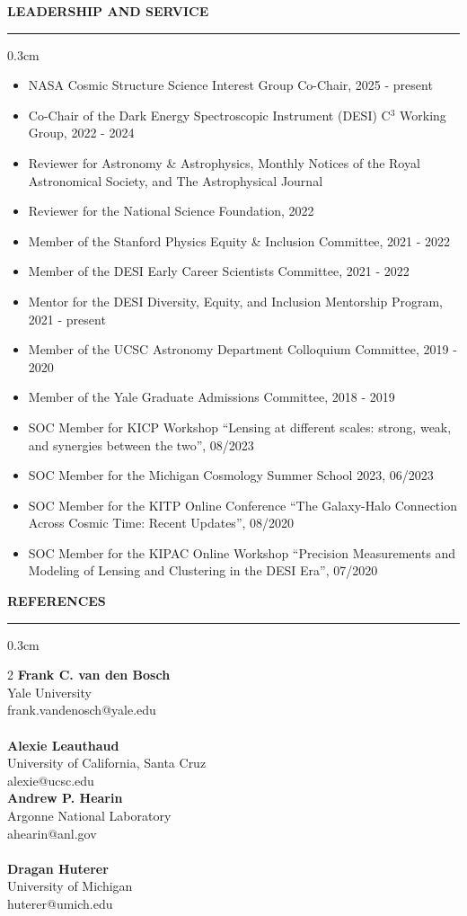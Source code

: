 \documentclass[12pt]{article}
\renewenvironment{section}[1]
  {
  \medskip
  {\color{aublue} \MakeUppercase{\bf #1}}
  \smallskip
  \hrule
  \medskip
  \begin{adjustwidth}{0.3cm}{}
  }
  {
  \end{adjustwidth}
  }
\newcommand{\entry}[3]{{\bf #1} \hfill {#2} \\ {#3}}
\begin{document}
\begin{section}{Leadership and Service}
  \begin{itemize}[leftmargin=0.5cm, topsep=0pt, itemsep=0pt, partopsep=0pt, parsep=0pt]
    \item NASA Cosmic Structure Science Interest Group Co-Chair, 2025 - present
    \item Co-Chair of the Dark Energy Spectroscopic Instrument (DESI) C$^3$ Working Group, 2022 - 2024
    \item Reviewer for Astronomy \& Astrophysics, Monthly Notices of the Royal Astronomical Society, and The Astrophysical Journal
    \item Reviewer for the National Science Foundation, 2022
    \item Member of the Stanford Physics Equity \& Inclusion Committee, 2021 - 2022
    \item Member of the DESI Early Career Scientists Committee, 2021 - 2022
    \item Mentor for the DESI Diversity, Equity, and Inclusion Mentorship Program, 2021 - present
    \item Member of the UCSC Astronomy Department Colloquium Committee, 2019 - 2020
    \item Member of the Yale Graduate Admissions Committee, 2018 - 2019
    \item SOC Member for KICP Workshop ``Lensing at different scales: strong, weak, and synergies between the two'', 08/2023
    \item SOC Member for the Michigan Cosmology Summer School 2023, 06/2023
    \item SOC Member for the KITP Online Conference ``The Galaxy-Halo Connection Across Cosmic Time: Recent Updates'', 08/2020
    \item SOC Member for the KIPAC Online Workshop ``Precision Measurements and Modeling of Lensing and Clustering in the DESI Era'', 07/2020
  \end{itemize}
\end{section}

\begin{section}{References}
    \begin{multicols*}{2}
    \entry{Frank C. van den Bosch}{}{Yale University\\frank.vandenosch@yale.edu} \\ \\
    \entry{Alexie Leauthaud}{}{University of California, Santa Cruz\\alexie@ucsc.edu} \columnbreak \\
    \entry{Andrew P. Hearin}{}{Argonne National Laboratory\\ahearin@anl.gov} \\ \\
    \entry{Dragan Huterer}{}{University of Michigan\\huterer@umich.edu}
    \end{multicols*}
\end{section}
\end{document}
